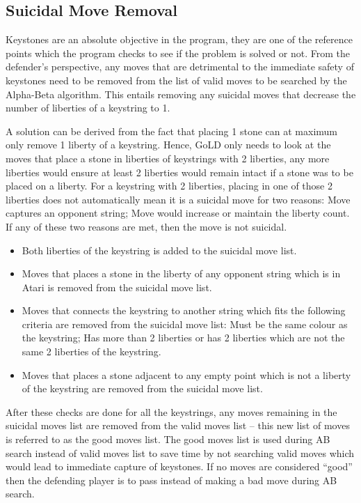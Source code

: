 \documentclass{l4proj}
\begin{document}
\subsection{Suicidal Move Removal}
Keystones are an absolute objective in the program, they are one of the reference points which the program checks to see if the problem is solved or not. From the defender’s perspective, any moves that are detrimental to the immediate safety of keystones need to be removed from the list of valid moves to be searched by the Alpha-Beta algorithm. This entails removing any suicidal moves that decrease the number of liberties of a keystring to 1.

A solution can be derived from the fact that placing 1 stone can at maximum only remove 1 liberty of a keystring. Hence, GoLD only needs to look at the moves that place a stone in liberties of keystrings with 2 liberties, any more liberties would ensure at least 2 liberties would remain intact if a stone was to be placed on a liberty. For a keystring with 2 liberties, placing in one of those 2 liberties does not automatically mean it is a suicidal move for two reasons: Move captures an opponent string; Move would increase or maintain the liberty count. If any of these two reasons are met, then the move is not suicidal.

\begin{itemize}
    \item Both liberties of the keystring is added to the suicidal move list.
    \item Moves that places a stone in the liberty of any opponent string which is in Atari is removed from the suicidal move list.
    \item Moves that connects the keystring to another string which fits the following criteria are removed from the suicidal move list: Must be the same colour as the keystring; Has more than 2 liberties or has 2 liberties which are not the same 2 liberties of the keystring.
    \item Moves that places a stone adjacent to any empty point which is not a liberty of the keystring are removed from the suicidal move list.
\end{itemize}

After these checks are done for all the keystrings, any moves remaining in the suicidal moves list are removed from the valid moves list – this new list of moves is referred to as the good moves list. The good moves list is used during AB search instead of valid moves list to save time by not searching valid moves which would lead to immediate capture of keystones. If no moves are considered “good” then the defending player is to pass instead of making a bad move during AB search.
\end{document}
